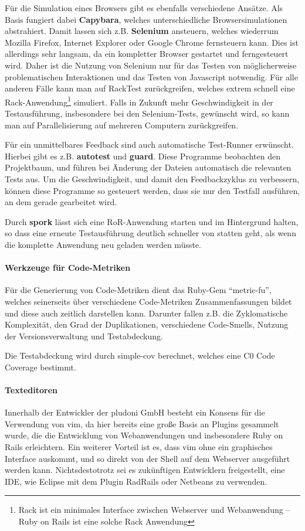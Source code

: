 Für die Simulation eines Browsers gibt es ebenfalls verschiedene Ansätze. Als Basis fungiert dabei \textbf{Capybara}, welches unterschiedliche Browsersimulationen abstrahiert. Damit lassen sich z.B. \textbf{Selenium} ansteuern, welches wiederrum Mozilla Firefox, Internet Explorer oder Google Chrome fernsteuern kann. Dies ist allerdings sehr langsam, da ein kompletter Browser gestartet und ferngesteuert wird. Daher ist die Nutzung von Selenium nur für das Testen von möglicherweise problematischen Interaktionen und das Testen von Javascript notwendig. Für alle anderen Fälle kann man auf RackTest zurückgreifen, welches extrem schnell eine Rack-Anwendung\footnote{Rack ist ein minimales Interface zwischen Webserver und Webanwendung -- Ruby on Rails ist eine solche Rack Anwendung} simuliert.
Falls in Zukunft mehr Geschwindigkeit in der Testausführung, insbesondere bei den Selenium-Tests, gewünscht wird, so kann man auf Parallelisierung auf mehreren Computern zurückgreifen.

Für ein unmittelbares Feedback sind auch automatische Test-Runner erwünscht. Hierbei gibt es z.B. \textbf{autotest} und \textbf{guard}. Diese Programme beobachten den Projektbaum, und führen bei Änderung der Dateien automatisch die relevanten Tests aus. Um die Geschwindigkeit, und damit den Feedbackzyklus zu verbessern, können diese Programme so gesteuert werden, dass sie nur den Testfall ausführen, an dem gerade gearbeitet wird. 

Durch \textbf{spork} lässt sich eine RoR-Anwendung starten und im Hintergrund halten, so dass eine erneute Testausführung deutlich schneller von statten geht, als wenn die komplette Anwendung neu geladen werden müsste.

    
\paragraph{Werkzeuge für Code-Metriken}  Für die Generierung von Code-Metriken dient das Ruby-Gem "`metric-fu"', welches seinerseits über verschiedene Code-Metriken Zusammenfassungen bildet und diese auch zeitlich darstellen kann. Darunter fallen z.B. die Zyklomatische Komplexität, den Grad der Duplikationen, verschiedene Code-Smells, Nutzung der Versionsverwaltung und Testabdeckung.

Die Testabdeckung wird durch simple-cov berechnet, welches eine C0 Code Coverage bestimmt.

\paragraph{Texteditoren} Innerhalb der Entwickler der pludoni GmbH besteht ein Konsens für die Verwendung von vim, da hier bereits eine große Basis an Plugins gesammelt wurde, die die Entwicklung von Webanwendungen und insbesondere Ruby on Rails erleichtern. Ein weiterer Vorteil ist es, dass vim ohne ein graphisches Interface auskommt, und so direkt von der Shell auf dem Webserver ausgeführt werden kann.
Nichtsdestotrotz sei es zukünftigen Entwicklern freigestellt, eine IDE, wie Eclipse mit dem Plugin RadRails oder Netbeans zu verwenden.


